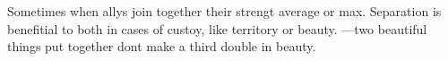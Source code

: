 Sometimes when allys join together their strengt average or max. 
Separation is benefitial to both in cases of custoy, like territory or beauty. 
---two beautiful things put together dont make a third double in beauty. 